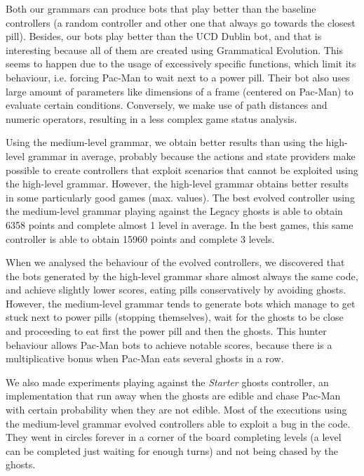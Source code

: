 \documentclass{llncs}
\newcommand{\paco}{Pac-Man }
\begin{document}
Both our grammars can produce bots that play better than the baseline controllers (a random controller and other one that always go towards the closest pill). Besides, our bots play better than the UCD Dublin bot, and that is interesting because all of them are created using Grammatical Evolution. This seems to happen due to the usage of excessively specific functions, which limit its behaviour, i.e. forcing \paco to wait next to a power pill. Their bot also uses large amount of parameters like dimensions of a frame (centered on Pac-Man) to evaluate certain conditions. Conversely, we make use of path distances and numeric operators, resulting in a less complex game status analysis.

Using the medium-level grammar, we obtain better results than using the high-level grammar in average, probably because the actions and state providers make possible to create controllers that exploit scenarios that cannot be exploited using the high-level grammar. However, the high-level grammar obtains better results in some particularly good games (max. values). The best evolved controller using the medium-level grammar playing against the Legacy ghosts is able to obtain 6358 points and complete almost 1 level in average. In the best games, this same controller is able to obtain 15960 points and complete 3 levels.

When we analysed the behaviour of the evolved controllers, we discovered that the bots generated by the high-level grammar share almost always the same code, and achieve slightly lower scores, eating pills conservatively by avoiding ghosts. However, the medium-level grammar tends to generate bots which manage to get stuck next to power pills (stopping themselves), wait for the ghosts to be close and proceeding to eat first the power pill and then the ghosts. This hunter behaviour allows \paco bots to achieve notable scores, because there is a multiplicative bonus when \paco eats several ghosts in a row.

We also made experiments playing against the \emph{Starter} ghosts controller, an implementation that run away when the ghosts are edible and chase \paco with certain probability when they are not edible. Most of the executions using the medium-level grammar evolved controllers able to exploit a bug in the code. They went in circles forever in a corner of the board completing levels (a level can be completed just waiting for enough turns) and not being chased by the ghosts.
\end{document}

